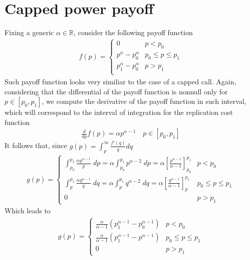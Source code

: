 \documentclass[12pt]{article}
\begin{document}
\section{Capped power payoff}
Fixing a generic $\alpha\in\mathbb{R}$, consider the following payoff function
\begin{align*}
    f(p) = \begin{cases}
               0                      & p<p_0             \\
               p^\alpha -p_0^\alpha   & p_0\leq p\leq p_1 \\
               p_1^\alpha -p_0^\alpha & p> p_1            \\
           \end{cases}
\end{align*}
Such payoff function looks very similiar to the case of a capped call. Again, considering that the differential of the payoff function is nonnull only for $p\in[p_0,p_1]$, we compute the derivative of the payoff function in such interval, which will correspond to the interval of integration for the replication cost function
\begin{align*}
    \frac{d}{dp}f(p) = \alpha p^{\alpha-1} \quad p\in[p_0,p_1]
\end{align*}
It follows that, since $g(p)=\int_p^\infty \frac{f'(q)}{q}dq$
\begin{align*}
    g(p)=\begin{cases}
             \int_{p_0}^{p_1} \frac{\alpha p^{\alpha-1}}{p} \; dp = \alpha \int_{p_0}^{p_1}  p^{\alpha-2} \; dp                                                 = \alpha\left[\frac{p^{\alpha-1}}{\alpha-1}\right]^{p_1}_{p_0}                                            & p<p_0              \\
             \int_{p}^{p_1} \frac{\alpha q^{\alpha-1}}{q} \; dq                                                     = \alpha \int_{p}^{p_1}  q^{\alpha-2} \; dq                                              = \alpha\left[\frac{q^{\alpha-1}}{\alpha-1}\right]^{p_1}_{p} & p_0 \leq p\leq p_1 \\
             0                                                                                                                                                                                                                                                            & p>p_1
         \end{cases}
\end{align*}
Which leads to
\begin{align*}
    g(p)=\begin{cases}
             \frac{\alpha}{\alpha-1}(p_1^{\alpha-1}-p_0^{\alpha-1}) & p<p_0              \\
             \frac{\alpha}{\alpha-1}(p_1^{\alpha-1}-p^{\alpha-1})   & p_0 \leq p\leq p_1 \\
             0                                                      & p>p_1
         \end{cases}
\end{align*}
\end{document}
